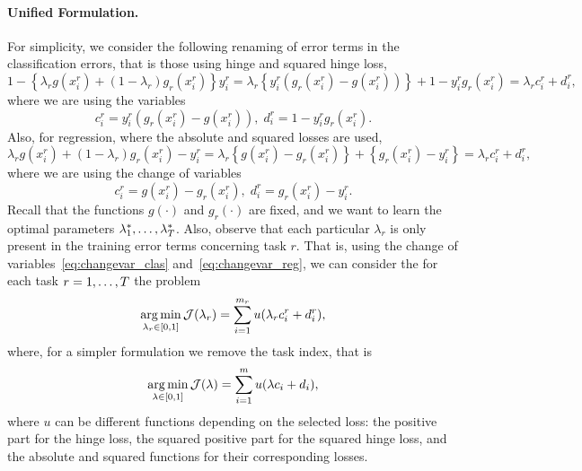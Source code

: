 \paragraph*{Unified Formulation.\\}
For simplicity, we consider the following renaming of error terms in the classification errors, that is those using hinge and squared hinge loss,
\begin{equation}\nonumber
    1 - \left\{\lambda_r g(x_i^r) + (1-\lambda_r) g_r(x_i^r)  \right\} y_i^r = \lambda_r \left\{ y_i^r (g_r(x_i^r) - g(x_i^r)) \right\} +  1 - y_i^r g_r(x_i^r) 
     = \lambda_r c_i^r + d_i^r ,
\end{equation}
where we are using the variables
\begin{equation}
    \label{eq:changevar_clas}
    c_i^r =  y_i^r (g_r(x_i^r) - g(x_i^r))  , \;  d_i^r =  1 - y_i^r g_r(x_i^r) .
\end{equation}
Also, for regression, where the absolute and squared losses are used,
\begin{equation}\nonumber
    \lambda_r g(x_i^r) + (1-\lambda_r)g_r(x_i^r) - y_i^r = \lambda_r \left\{g(x_i^r) - g_r(x_i^r) \right\} + \left\{g_r(x_i^r) - y_i^r \right\} 
    = \lambda_r c_i^r + d_i^r,
\end{equation}
where we are using the change of variables
\begin{equation}
    \label{eq:changevar_reg}
    c_i^r = g(x_i^r) - g_r(x_i^r)  , \;  d_i^r =  g_r(x_i^r) - y_i^r .
\end{equation}
Recall that the functions $g(\cdot)$ and $g_r(\cdot)$ are fixed, and we want to learn the optimal parameters $\lambda_1^*, \ldots, \lambda_T^*$. Also, observe that each particular $\lambda_r$ is only present in the training error terms concerning task $r$. That is, using the change of variables~\eqref{eq:changevar_clas} and~\eqref{eq:changevar_reg}, we can consider the for each task $r=1, \ldots, T$ the problem
\begin{equation}
    \nonumber
    \operatorname*{arg\min}_{\lambda_r \in [0, 1]} \mathcal{J}(\lambda_r) = \sum_{i=1}^{m_r} u(\lambda_r c_i^r + d_i^r),
\end{equation}
where, for a simpler formulation we remove the task index, that is 
\begin{equation}
    \label{eq:subproblem_lambda}
    \argmin_{\lambda \in [0, 1]} \mathcal{J}(\lambda) = \sum_{i=1}^{\npertask} u(\lambda c_i + d_i),
\end{equation}
where $u$ can be different functions depending on the selected loss: the positive part for the hinge loss, the squared positive part for the squared hinge loss, and the absolute and squared functions for their corresponding losses.

